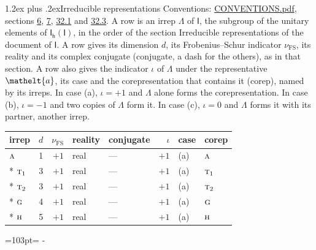 \documentclass[10pt,a4paper]{article}
\makeatletter
\renewcommand\section{\@startsection{section}{1}{\z@}{-3ex plus -1ex minus -.2ex}%
  {1.2ex plus .2ex}{\normalfont\large\sffamily\bfseries\color{parttitle}}}
\newcommand{\needspace}[1]{\par\penalty-100\begingroup\dimen0=#1\relax\dimen2=\pagegoal
  \advance\dimen2-\pagetotal\ifdim\dimen0>\dimen2\relax\ifdim\dimen2>0pt\vfil\break\fi\fi
  \endgroup}
\numberwithin{equation}{section}
\newcommand{\eltfont}[1]{{\let\sigma\eltsigma\mathelt{#1}}}
\newcommand{\grp}[1]{\mathsf{#1}}
\newcommand{\irr}[1]{\text{\normalfont\scshape #1}}
\newcommand{\elt}[1]{\eltfont{#1}}
\newcommand{\fsind}{\nu_{\mathrm{FS}}}
\makeatother
\begin{document}
\section{Irreducible representations}\label{s:irreps}
Conventions: \href{../../CONVENTIONS.pdf}{CONVENTIONS.pdf}, sections \href{../../../rotation/CONVENTIONS.pdf\#conv.6}{6}, \href{../../../rotation/CONVENTIONS.pdf\#conv.7}{7}, \href{../../CONVENTIONS.pdf\#conv.32.1}{32.1} and \href{../../CONVENTIONS.pdf\#conv.32.3}{32.3}.
\leavevmode\label{n:irrep.Delta}A row is an irrep $\Lambda$ of $\grp{I}$, the subgroup of the unitary elements of $\grp{I_{h}}(\grp{I})$, in the order of the section Irreducible representations of the document of \href{../../../rotation/data/pdf/I.pdf}{$\grp{I}$}. \label{n:index.dimension}\label{n:index.frobenius}\label{n:head.irrep}\label{n:head.reality}\label{n:head.conjugate}A row gives its dimension $d$, its Frobenius--Schur indicator $\fsind$, its reality and its complex conjugate (conjugate, a dash for the others), as in that section. \label{n:head.case.corep}\label{n:head.corep}A row also gives the indicator $\iota$ of $\Lambda$ under the representative $\elt{a}$, its case and the corepresentation that contains it (corep), named by its irreps. In case (a), $\iota = +1$ and $\Lambda$ alone forms the corepresentation. In case (b), $\iota = -1$ and two copies of $\Lambda$ form it. In case (c), $\iota = 0$ and $\Lambda$ forms it with its partner, another irrep.
\setlength{\emergencystretch}{2em}\par\setlength{\emergencystretch}{0pt}
{\small\renewcommand{\arraystretch}{1.25}\setlength{\tabcolsep}{4pt}\begin{longtable}{@{}lrrllrll@{}}\toprule
irrep & $d$ & $\fsind$ & reality & conjugate & $\iota$ & case & corep\\\midrule\endhead
\bottomrule\endfoot\endlastfoot
$\irr{a}$ & 1 & $+1$ & real & --- & $+1$ & (a) & $\irr{a}$\\*
$\irr{t}_{1}$ & 3 & $+1$ & real & --- & $+1$ & (a) & $\irr{t}_{1}$\\*
$\irr{t}_{2}$ & 3 & $+1$ & real & --- & $+1$ & (a) & $\irr{t}_{2}$\\*
$\irr{g}$ & 4 & $+1$ & real & --- & $+1$ & (a) & $\irr{g}$\\*
$\irr{h}$ & 5 & $+1$ & real & --- & $+1$ & (a) & $\irr{h}$\\
\bottomrule\end{longtable}}
\needspace{103pt}
\end{document}
